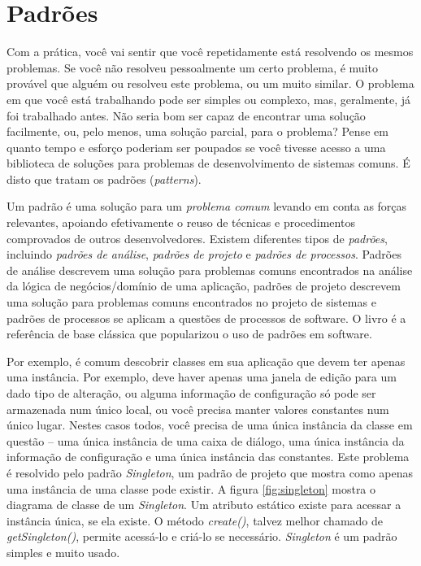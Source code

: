 \section{Padrões}

Com a prática, você vai sentir que você repetidamente está resolvendo os mesmos problemas. Se você não resolveu pessoalmente um certo problema, é muito provável que alguém ou resolveu este problema, ou um muito similar. O problema em que você está trabalhando pode ser simples ou complexo, mas, geralmente, já foi trabalhado antes. Não seria bom ser capaz de encontrar uma solução facilmente, ou, pelo menos, uma solução parcial, para o problema? Pense em quanto tempo e esforço poderiam ser poupados se você tivesse acesso a uma biblioteca de soluções para problemas de desenvolvimento de sistemas comuns. É disto que tratam os padrões (\textit{patterns}).

Um padrão é uma solução para um \emph{problema comum} levando em conta as forças relevantes, apoiando efetivamente o reuso de técnicas e procedimentos comprovados de outros desenvolvedores. Existem diferentes tipos de \emph{padrões}, incluindo \emph{padrões de análise}, \emph{padrões de projeto} e \emph{padrões de processos}. Padrões de análise descrevem uma solução para problemas comuns encontrados na análise da lógica de negócios/domínio de uma aplicação, padrões de projeto descrevem uma solução para problemas comuns encontrados no projeto de sistemas e padrões de processos se aplicam a questões de processos de software. O livro \cite{design:patterns} é a referência de base clássica que popularizou o uso de padrões em software.

Por exemplo, é comum descobrir classes em sua aplicação que devem ter apenas uma instância. Por exemplo, deve haver apenas uma janela de edição para um dado tipo de alteração, ou alguma informação de configuração só pode ser armazenada num único local, ou você precisa manter valores constantes num único lugar. Nestes casos todos, você precisa de uma única instância da classe em questão -- uma única instância de uma caixa de diálogo, uma única instância da informação de configuração e uma única instância das constantes. Este problema é resolvido pelo padrão \emph{Singleton}\label{p:singleton}, um padrão de projeto que mostra como apenas uma instância de uma classe pode existir. A figura \ref{fig:singleton} mostra o diagrama de classe de um \emph{Singleton}. Um atributo estático existe para acessar a instância única, se ela existe. O método \emph{create()}, talvez melhor chamado de \emph{getSingleton()}, permite acessá-lo e criá-lo se necessário. \emph{Singleton} é um padrão simples e muito usado.

